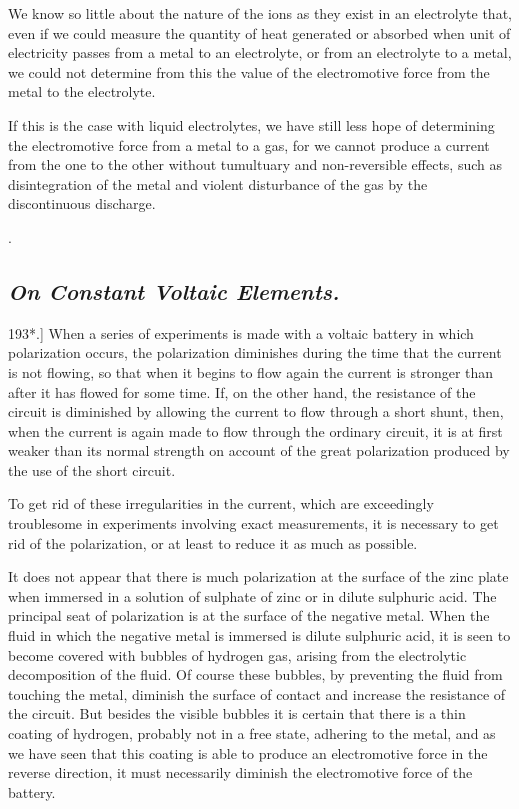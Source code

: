 \documentclass[12pt,oneside]{book}[2021/10/04]
\newcommand{\Heading}{\centering\normalfont}
\newcommand{\Subsection}[1]{\subsection*{\normalsize\Heading\itshape #1}}
\newcommand{\Runhead}[1]{\fancyhead[C]{\iffloatpage{}{\small#1}}}
\newcommand{\article}[1]{\phantomsection \label{art:#1}{#1.]}}
\newcommand{\¬}{\hphantom{0}}
\begin{document}
{We know so little about the nature of the ions as they exist in an electrolyte that,
even if we could measure the quantity of heat generated or absorbed when unit of
electricity passes from a metal to an electrolyte, or from an electrolyte to a metal, we
could not determine from this the value of the electromotive force from the metal to
the electrolyte.

If this is the case with liquid electrolytes, we have still less hope of determining the
electromotive force from a metal to a gas, for we cannot produce a current from the
one to the other without tumultuary and non-reversible effects, such as disintegration
of the metal and violent disturbance of the gas by the discontinuous discharge.
}.

\Subsection{On Constant Voltaic Elements.}

\article{193*} When a series of experiments is made with a voltaic
battery in which polarization occurs, the polarization diminishes
during the time that the current is not flowing, so that when
it begins to flow again the current is stronger than after it has
flowed for some time. If, on the other hand, the resistance of the
circuit is diminished by allowing the current to flow through a
short shunt, then, when the current is again made to flow through
the ordinary circuit, it is at first weaker than its normal strength
on account of the great polarization produced by the use of the
short circuit.

To get rid of these irregularities in the current, which are
exceedingly troublesome in experiments involving exact measurements,
it is necessary to get rid of the polarization, or at least
to reduce it as much as possible.

It does not appear that there is much polarization at the surface
of the zinc plate when immersed in a solution of sulphate of zinc
or in dilute sulphuric acid. The principal seat of polarization is
at the surface of the negative metal. When the fluid in which
the negative metal is immersed is dilute sulphuric acid, it is seen
to become covered with bubbles of hydrogen gas, arising from the
electrolytic decomposition of the fluid. Of course these bubbles,
by preventing the fluid from touching the metal, diminish the
surface of contact and increase the resistance of the circuit. But
besides the visible bubbles it is certain that there is a thin coating
of hydrogen, probably not in a free state, adhering to the metal,
and as we have seen that this coating is able to produce an electromotive
force in the reverse direction, it must necessarily diminish
the electromotive force of the battery.
\Runhead{CONSTANT BATTERIES.}
\end{document}
